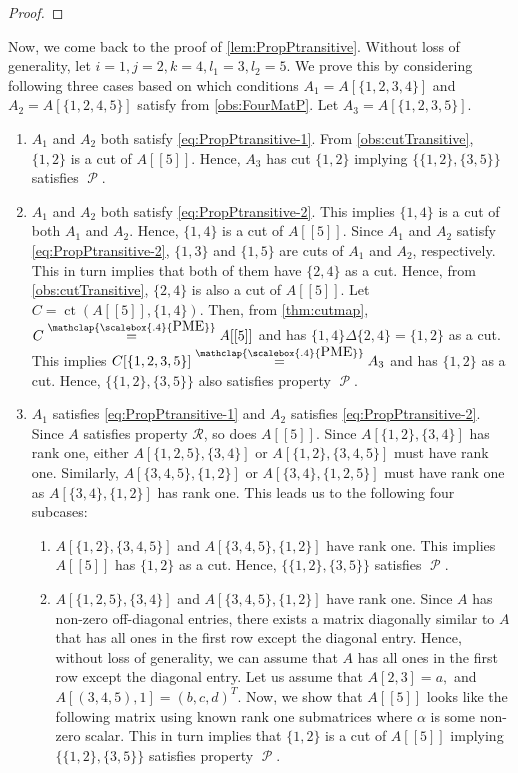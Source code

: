 \documentclass[11pt,letterpaper]{article}
\DeclareMathOperator{\calP}{\mathcal{P}}
\newcommand{\pp}[2]{\{\{#1\},\{#2\}\}}
\DeclareMathOperator*{\ct}{ct}
\newcommand{\PME}{\stackrel{\mathclap{\scalebox{.4}{\mbox{PME}}}}{=}}
\newcommand{\prop}{\mathcal{R}}
\begin{document}
{{{\begin{proof}
    \end{proof}
Now, we come back to the proof of \cref{lem:PropPtransitive}. Without loss of generality, let $i=1,j=2,k=4,l_1=3,l_2=5$.  We prove this by considering following three cases based on which conditions $A_1=A[\{1,2,3,4\}]$ and $A_2=A[\{1,2,4,5\}]$ satisfy from \cref{obs:FourMatP}. Let $A_3=A[\{1,2,3,5\}]$.
%
\begin{enumerate}
    \item $A_1$ and $A_2$ both satisfy \cref{eq:PropPtransitive-1}. From \cref{obs:cutTransitive}, $\{1,2\}$ is a cut of $A[[5]]$. Hence, $A_3$ has cut $\{1,2\}$ implying $\pp{1,2}{3,5}$ satisfies $\calP$.
    \item $A_1$ and $A_2$ both satisfy \cref{eq:PropPtransitive-2}. This implies $\{1,4\}$ is a cut of both $A_1$ and $A_2$. Hence, $\{1,4\}$ is a cut of $A[[5]].$ Since $A_1$ and $A_2$ satisfy \cref{eq:PropPtransitive-2}, $\{1,3\}$ and $\{1,5\}$ are cuts of $A_1$ and $A_2$, respectively. This in turn implies that both of them have $\{2,4\}$ as a cut. Hence, from \cref{obs:cutTransitive}, $\{2,4\}$ is also a cut of $A[[5]]$. Let $C=\ct(A[[5]],\{1,4\})$. Then, from \cref{thm:cutmap}, $C\PME A[[5]]$ and has $\{1,4\}\Delta \{2,4\}=\{1,2\}$ as a cut. This implies $C[\{1,2,3,5\}]\PME A_3$ and has $\{1,2\}$ as a cut. Hence, $\pp{1,2}{3,5}$ also satisfies property $\calP$.
    \item $A_1$ satisfies \cref{eq:PropPtransitive-1} and $A_2$ satisfies \cref{eq:PropPtransitive-2}. Since $A$ satisfies property $\prop$, so does $A[[5]]$. Since $A[\{1,2\},\{3,4\}]$ has rank one, either $A[\{1,2,5\},\{3,4\}]$ or $A[\{1,2\},\{3,4,5\}]$ must have rank one. Similarly, $A[\{3,4,5\},\{1,2\}]$ or $A[\{3,4\},\{1,2,5\}]$ must have rank one as $A[\{3,4\},\{1,2\}]$ has rank one. This leads us to the following four subcases:
    \begin{enumerate}
        \item $A[\{1,2\},\{3,4,5\}]$ and $A[\{3,4,5\},\{1,2\}]$ have rank one. This implies $A[[5]]$ has $\{1,2\}$ as a cut. Hence, $\pp{1,2}{3,5}$ satisfies $\calP$.
        \item\label{item:cut-detec-lem1-case3b} $A[\{1,2,5\},\{3,4\}]$ and $A[\{3,4,5\},\{1,2\}]$ have rank one. Since $A$ has  non-zero off-diagonal entries, there exists a matrix diagonally similar to $A$ that has all ones in the first row except the diagonal entry. Hence,  without loss of generality, we can assume that $A$ has all ones in the first row except the diagonal entry. Let us assume that $A[2,3]=a,$ and $A[(3,4,5),1]=(b,c,d)^T$. Now, we show that $A[[5]]$ looks like the following matrix using known rank one submatrices where $\alpha$ is some non-zero scalar. This in turn implies that $\{1,2\}$ is a cut of $A[[5]]$ implying $\pp{1,2}{3,5}$ satisfies property $\calP$.

\end{enumerate}
\end{enumerate}}}}
\end{document}
